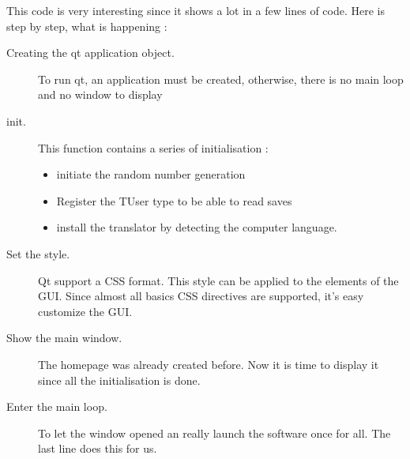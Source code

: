 This code is very interesting since it shows a lot in a few lines of code. Here is step by step, what is happening :
\begin{description}
	\item[Creating the qt application object.] To run qt, an application must be created, otherwise, there is no main loop and no window to display
	\item[init.]  This function contains a series of initialisation :
	\begin{itemize}
		\item initiate the random number generation
		\item Register the TUser type to be able to read saves 
		\item install the translator by detecting the computer language.
	\end{itemize}
	\item[Set the style.] Qt support a CSS format. This style can be applied to the elements of the GUI. Since almost all basics CSS directives are supported, it's easy customize the GUI.
	\item[Show the main window.] The homepage was already created before. Now  it is time to display it since all the initialisation is done.
	\item[Enter the main loop.] To let the window opened an really launch the software once for all. The last line does this for us.
\end{description}

